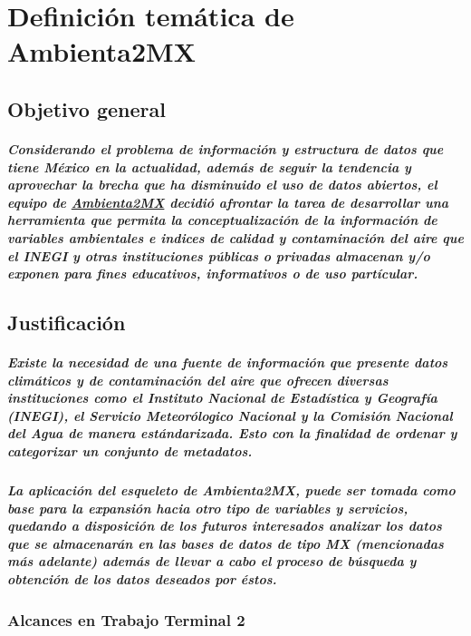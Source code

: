 \chapter {Definici\'on tem\'atica de Ambienta2MX}
  \section {Objetivo general}
    \paragraph {Considerando el problema de informaci\'on y estructura de datos que tiene M\'exico en la actualidad, adem\'as de seguir la tendencia y aprovechar la brecha que ha disminuido el uso de datos abiertos, el equipo de \underline{Ambienta2MX} decidi\'o afrontar la tarea de desarrollar una herramienta que permita la conceptualizaci\'on de la informaci\'on de variables ambientales e indices de calidad y contaminaci\'on del aire que el INEGI y otras instituciones p\'ublicas o privadas almacenan y/o exponen para fines educativos, informativos o de uso part\'icular.}
  
  \section{Justificación}
    \paragraph{Existe la necesidad de una fuente de información que presente datos climáticos y de contaminación del aire que ofrecen diversas instituciones como el Instituto Nacional de Estadística y Geografía (INEGI), el Servicio Meteorólogico Nacional y la Comisión Nacional del Agua de manera estándarizada.
               Esto con la finalidad de ordenar y categorizar un conjunto de metadatos.}
    \paragraph{La aplicación del esqueleto de Ambienta2MX, puede ser tomada como base para la expansión hacia otro tipo de variables y servicios, quedando a disposición de los futuros interesados analizar los datos que se almacenarán en las bases de datos de tipo MX (mencionadas más adelante) además de llevar a cabo el proceso de búsqueda y obtención de los datos deseados por éstos.}
    \subsection{Alcances en Trabajo Terminal 2}
